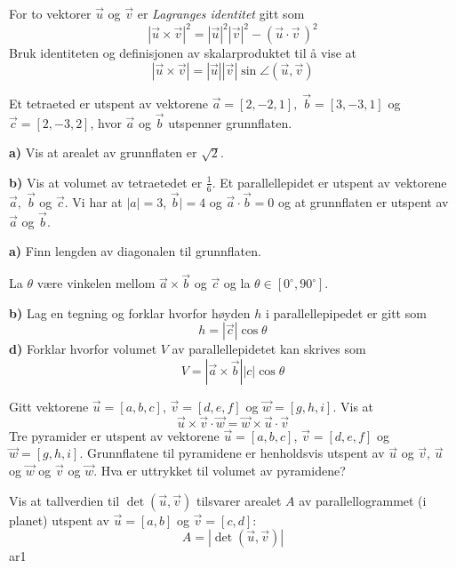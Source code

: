 For to vektorer $ \vec{u} $ og $ \vec{v} $ er \textit{Lagranges identitet} gitt som
\[ |\vec{u}\times\vec{v}|^2=|\vec{u}|^2|\vec{v}|^2-(\vec{u}\cdot\vec{v}\,)^2 \]
Bruk identiteten og definisjonen av skalarproduktet til å vise at
\[ |\vec{u}\times\vec{v}|=|\vec{u}||\vec{v}|\sin \angle(\vec{u}, \vec{v})  \]\vds

Et tetraeted er utspent av vektorene $ \vec{a}=[2, -2, 1],\; \vec{b}=[3, -3, 1] $ og $ \vec{c}=[2, -3, 2] $, hvor $ \vec{a} $ og $ \vec{b} $ utspenner grunnflaten.\os

\textbf{a)} Vis at arealet av grunnflaten er $ \sqrt{2} $.\os

\textbf{b)} Vis at volumet av tetraetedet er $ \frac{1}{6} $.
\newpage
{}
Et parallellepidet er utspent av vektorene $ \vec{a},\; \vec{b} $ og $ \vec{c} $. Vi har at ${|a|=3}$,  ${\vec{b}|=4}$ og $ {\vec{a}\cdot \vec{b}=0}  $ og at grunnflaten er utspent av $ \vec{a} $ og $ \vec{b} $. \os

\textbf{a)} Finn lengden av diagonalen til grunnflaten.\os

La $ \theta $ være vinkelen mellom $ {\vec{a}\times\vec{b}} $ og $ \vec{c} $ og la $ {\theta\in[0^\circ, 90^\circ]} $.\os

\textbf{b)} Lag en tegning og forklar hvorfor høyden $ h $ i parallellepipedet er gitt som
\[ h= |\vec{c}|\cos \theta \]
\textbf{d)} Forklar hvorfor volumet $ V $ av parallellepidetet kan skrives som
\[ V= |\vec{a}\times\vec{b}||c|\cos \theta\]\vds

Gitt vektorene $ \vec{u}=[a, b, c] $, $ \vec{v}=[d, e, f] $ og $ \vec{w}=[g, h, i] $. Vis at
\[ \vec{u}\times\vec{v}\cdot\vec{w}= \vec{w}\times\vec{u}\cdot\vec{v}\]
Tre pyramider er utspent av vektorene $ \vec{u}=[a, b, c] $, $ \vec{v}=[d, e, f] $ og $ \vec{w}=[g, h, i] $. Grunnflatene til pyramidene er henholdsvis utspent av $ \vec{u} $ og $ \vec{v} $, $ \vec{u} $ og $ \vec{w} $ og $ \vec{v} $ og $ \vec{w} $. Hva er uttrykket til volumet av pyramidene?

\ekspop
Vis at tallverdien til $ \det(\vec{u}, \vec{v}) $ tilsvarer arealet $ A $ av parallellogrammet (i planet) utspent av $ \vec{u}=[a, b] $ og $ \vec{v}=[c, d] $:
\[ A = |\det(\vec{u}, \vec{v})| \]
{ar1}

